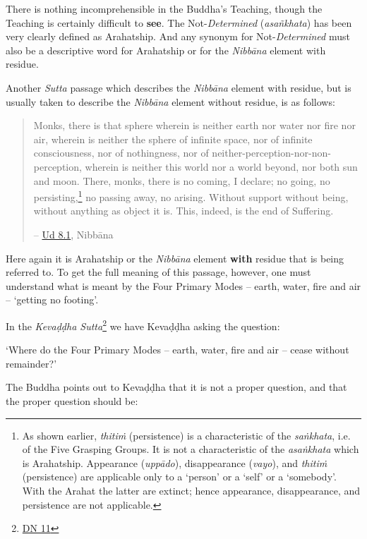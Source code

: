 There is nothing incomprehensible in the Buddha's Teaching, though the Teaching is certainly difficult to \textbf{see}. The Not-\emph{Determined} (\emph{asañkhata}) has been very clearly defined as Arahatship. And any synonym for Not-\emph{Determined} must also be a descriptive word for Arahatship or for the \emph{Nibbāna} element with residue.

Another \emph{Sutta} passage which describes the \emph{Nibbāna} element with residue, but is usually taken to describe the \emph{Nibbāna} element without residue, is as follows:

\begin{quote}
Monks, there is that sphere wherein is neither earth nor water nor fire nor air, wherein is neither the sphere of infinite space, nor of infinite consciousness, nor of nothingness, nor of neither-perception-nor-non-perception, wherein is neither this world nor a world beyond, nor both sun and moon. There, monks, there is no coming, I declare; no going, no persisting,\footnote{As shown earlier, \emph{thitiṁ} (persistence) is a characteristic of the \emph{saṅkhata}, i.e. of the Five Grasping Groups. It is not a characteristic of the \emph{asaṅkhata} which is Arahatship. Appearance (\emph{uppādo}), disappearance (\emph{vayo}), and \emph{thitiṁ} (persistence) are applicable only to a `person' or a `self' or a `somebody'. With the Arahat the latter are extinct; hence appearance, disappearance, and persistence are not applicable.} no passing away, no arising. Without support without being, without anything as object it is. This, indeed, is the end of Suffering.

 -- \href{https://suttacentral.net/ud8.1/en/anandajoti}{Ud 8.1}, Nibbāna
\end{quote}

Here again it is Arahatship or the \emph{Nibbāna} element \textbf{with} residue that is being referred to. To get the full meaning of this passage, however, one must understand what is meant by the Four Primary Modes -- earth, water, fire and air -- `getting no footing'.

In the \emph{Kevaḍḍha Sutta}\footnote{\href{https://suttacentral.net/dn11/en/sujato}{DN 11}} we have Kevaḍḍha asking the question:

`Where do the Four Primary Modes -- earth, water, fire and air -- cease without remainder?'

The Buddha points out to Kevaḍḍha that it is not a proper question, and that the proper question should be:

